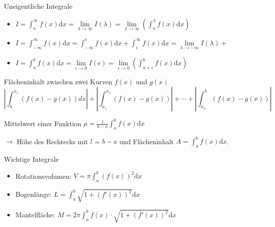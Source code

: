 \begin{concept}{Uneigentliche Integrale}
\begin{itemize}
    \item $I=\int_a^{\infty}{f(x)\mathrm{d}x}=\underset{\lambda \rightarrow \infty}{\lim}I(\lambda)=
		\underset{\lambda \rightarrow \infty}{\lim}(\int_a^{\lambda}{f(x)\mathrm{d}x})$
    \item $I=\int_{-\infty}^{\infty}{f(x)\mathrm{d}x}=\int_{-\infty}^{c}{f(x)\mathrm{d}x}+\int_c^{\infty}
		{f(x)\mathrm{d}x} = \underset{\lambda \rightarrow -\infty}{\lim}I(\lambda)+$
    \item $I=\int_a^b{f(x)\mathrm{d}x}=\underset{\epsilon \rightarrow 0}{\lim}I(\epsilon)=\underset{\epsilon \rightarrow
	0}{\lim}(\int_{a+\epsilon}^b{f(x)\mathrm{d}x})$
\end{itemize}
\end{concept}

\begin{KR}{Flächeninhalt zwischen zwei Kurven $f(x)$ und $g(x)$}
		$$\left|\int_{a}^{x_{1}}(f(x)-g(x)) d x\right|+\left|\int_{x_{1}}^{x_{2}}(f(x)-g(x))\right|+\cdots+\left|\int_{x_{n}}^{b}(f(x)-g(x))\right|$$
\end{KR}


\begin{theorem}{Mittelwert einer Funktion}
    $\mu = \frac{1}{b-a}\int_a^b{f(x)\mathrm{d}x}$

    \small
    $\rightarrow$ Höhe des Rechtecks mit $l$ = $b-a$ und Flächeninhalt $A = \int_a^b{f(x)\mathrm{d}x}$.
\end{theorem}

\begin{corollary}{Wichtige Integrale}
    \begin{itemize}
        \item Rotationsvolumen: $V = \pi \int_a^b{(f(x))^2\mathrm{d}x} $
        \item Bogenlänge: $L = \int_a^b{\sqrt{1+(f'(x))^2}\mathrm{d}x} $
        \item Mantelfläche: $M = 2\pi \int_a^b{f(x)\cdot \sqrt{1+(f'(x))^2}\mathrm{d}x}$
    \end{itemize}
\end{corollary}




\raggedcolumns





